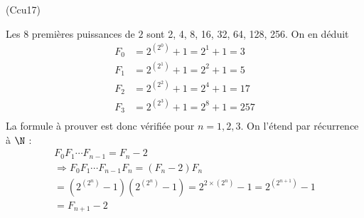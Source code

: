 \begin{tiny}(Ccu17)\end{tiny} Les 8 premières puissances de $2$ sont 2, 4, 8, 16, 32, 64, 128, 256. On en déduit
\begin{align*}
  F_0 &= 2^{(2^0)}+1 = 2^1+1 = 3\\
  F_1 &= 2^{(2^1)}+1 = 2^2+1 = 5\\
  F_2 &= 2^{(2^2)}+1 = 2^4+1 = 17\\
  F_3 &= 2^{(2^3)}+1 = 2^8+1 = 257\\
\end{align*}
La formule à prouver est donc vérifiée pour $n=1, 2, 3$. On l'étend par récurrence à $\N$ :
\begin{multline*}
  F_0 F_1 \cdots F_{n-1} = F_n -2 \\
  \Rightarrow
  F_0 F_1 \cdots F_{n-1}F_n = (F_n-2)F_n \\
  = (2^{(2^{n})}-1)(2^{(2^{n})}-1)
  = 2^{2\times(2^{n})} -1 = 2^{(2^{n+1})} -1\\
  = F_{n+1} - 2
\end{multline*}
